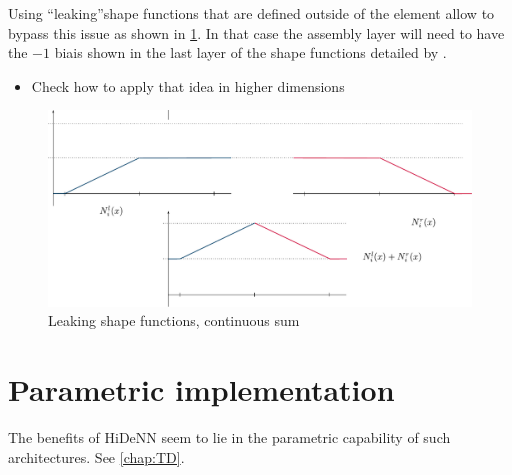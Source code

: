 Using ``leaking''shape functions that are defined outside of the element \parencite{zhang_hierarchical_2021} allow to bypass this issue as shown in \cref{fig:Continuous}. In that case the assembly layer will need to have the $-1$ biais shown in the last layer of the shape functions detailed by \cite{zhang_hierarchical_2021}.
\begin{itemize}
    \item[\faLightbulb] Check how to apply that idea in higher dimensions
\end{itemize}
\begin{figure}[hbpt]
    \centering
    \includegraphics[width=\linewidth]{Schema/Continuous_sum.pdf}
    \caption{Leaking shape functions, continuous sum}
    \label{fig:Continuous}
\end{figure}

\section{Parametric implementation}
The benefits of HiDeNN seem to lie in the parametric capability of such architectures. See \cref{chap:TD}.
